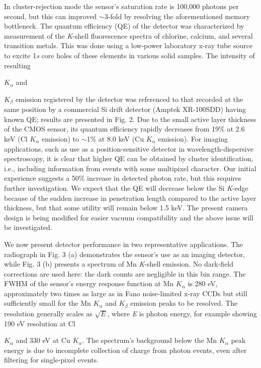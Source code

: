 In cluster-rejection mode the sensor's saturation rate is 100,000
photons per second, but this can improved $\sim$3-fold by
resolving the aforementioned memory bottleneck. The quantum efficiency
(QE) of the detector was characterized by measurement of the
\emph{K}-shell fluorescence spectra of chlorine, calcium, and several
transition metals. This was done using a low-power laboratory x-ray tube
source to excite 1\emph{s} core holes of these elements in various solid
samples. The intensity of resulting
\(K_{\alpha}\)
and
\(K_{\beta}\)
emission registered by the detector was referenced to that recorded at
the same position by a commercial Si drift detector (Amptek XR-100SDD)
having known QE; results are presented in Fig. 2. Due to the small
active layer thickness of the CMOS sensor, its quantum efficiency
rapidly decreases from 19\% at 2.6 keV (Cl \(K_{\alpha}\) emission) to
$\sim$1\% at 8.0 keV (Cu \(K_{\alpha}\) emission). For
imaging applications, such as use as a position-sensitive detector in
wavelength-dispersive spectroscopy, it is clear that higher QE can be
obtained by cluster identification, i.e., including information from
events with some multipixel character. Our initial experience suggests a
50\% increase in detected photon rate, but this requires further
investigation. We expect that the QE will decrease below the Si
\emph{K}-edge because of the sudden increase in penetration length
compared to the active layer thickness, but that some utility will
remain below 1.5 keV. The present camera design is being modified for
easier vacuum compatibility and the above issue will be investigated.

We now present detector performance in two representative applications.
The radiograph in Fig. 3 (a) demonstrates the sensor's use as an imaging
detector, while Fig. 3 (b) presents a spectrum of Mn \emph{K}-shell
emission. No dark-field corrections are used here: the dark counts are
negligible in this bin range. The FWHM of the sensor's energy response
function at Mn \(K_{\alpha}\) is 280 eV, approximately two times as
large as in Fano noise-limited x-ray CCDs but still sufficiently small
for the Mn \(K_{\alpha}\) and \(K_{\beta}\) emission peaks to be
resolved. The resolution generally scales as \(\sqrt{E}\), where
\emph{E} is photon energy, for example showing 190 eV resolution at Cl
\(K_{\alpha}\)
and 330 eV at Cu \(K_{\alpha}\). The spectrum's background below the Mn
\(K_{\alpha}\) peak energy is due to incomplete collection of charge
from photon events, even after filtering for single-pixel events.

